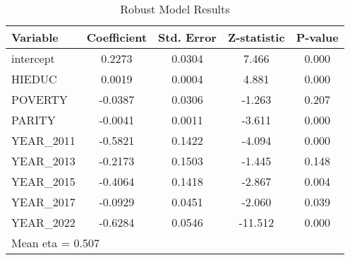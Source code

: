 \begin{table}[htbp]
\centering
\caption{Robust Model Results}
\label{tab:robust_results}
\begin{tabular}{lcccc}
\hline
Variable & Coefficient & Std. Error & Z-statistic & P-value \\
\hline
intercept & 0.2273 & 0.0304 & 7.466 & 0.000 \\
HIEDUC & 0.0019 & 0.0004 & 4.881 & 0.000 \\
POVERTY & -0.0387 & 0.0306 & -1.263 & 0.207 \\
PARITY & -0.0041 & 0.0011 & -3.611 & 0.000 \\
YEAR\_2011 & -0.5821 & 0.1422 & -4.094 & 0.000 \\
YEAR\_2013 & -0.2173 & 0.1503 & -1.445 & 0.148 \\
YEAR\_2015 & -0.4064 & 0.1418 & -2.867 & 0.004 \\
YEAR\_2017 & -0.0929 & 0.0451 & -2.060 & 0.039 \\
YEAR\_2022 & -0.6284 & 0.0546 & -11.512 & 0.000 \\
\hline
\multicolumn{5}{l}{Mean eta = 0.507}
\end{tabular}
\end{table}